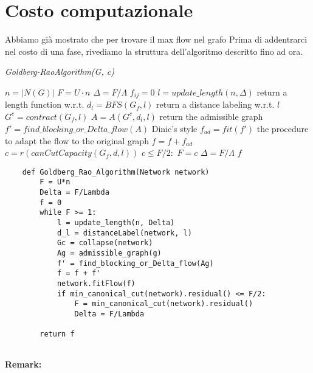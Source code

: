 \section{Costo computazionale}
    Abbiamo già mostrato che per trovare il max flow nel grafo 
    Prima di addentrarci nel costo di una fase, rivediamo la struttura dell'algoritmo descritto fino ad ora.

    \begin{algorithm}
        \caption{\textit{Goldberg-RaoAlgorithm(G, c)}}
        \label{algotrans}
        \begin{algorithmic}[1]
            \State $n = |N(G)|$
            \State $F = U\cdot n$
            \State $\Delta = F/ \Lambda$
                $f_{ij} = 0$
            \EndFor
                \State $l = update\_length(n, \Delta)$ \Comment return a length function w.r.t. \dlt
                \State $d_l = BFS(G_f, l)$ \Comment return a distance labeling w.r.t. $l$
                \State $G^c = contract(G_f, l)$ 
                \State $A = A(G^c, d_l, l)$ \Comment return the admissible graph
                \State $f' = find\_blocking\_or\_Delta\_flow(A)$ \Comment Dinic's style 
                \State $f_{ad} = fit(f')$ \Comment the procedure to adapt the flow to the original graph
                \State $f = f + f_{ad}$
                \State $c = r(canCutCapacity(G_f,d, l))$
                \If $c \le F/2:$ 
                    \State $F = c$
                    \State $\Delta = F/\Lambda$
                \EndIf
            \EndWhile 
            \State \Return $f$
        \end{algorithmic}
    \end{algorithm}

    \begin{verbatim}
    def Goldberg_Rao_Algorithm(Network network)
        F = U*n
        Delta = F/Lambda
        f = 0
        while F >= 1:
            l = update_length(n, Delta)
            d_l = distanceLabel(network, l)
            Gc = collapse(network)
            Ag = admissible_graph(g)
            f' = find_blocking_or_Delta_flow(Ag)
            f = f + f'
            network.fitFlow(f)
            if min_canonical_cut(network).residual() <= F/2: 
                F = min_canonical_cut(network).residual()
                Delta = F/Lambda

        return f
        
    \end{verbatim}
\textbf{Remark:}
        
